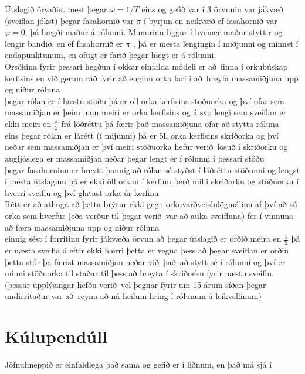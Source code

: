 \documentclass[a4]{article}
\begin{document}
  Útslagið örvaðist mest þegar $\omega = 1/T$ eins og gefið var í 3
 örvunin var jákvæð (sveiflan jókst) þegar  fasahornið var $\pi$ í byrjun en neikvæð ef fasahornið var  $\varphi = 0$, þá hægði maður á rólunni.
 Munurinn liggur í hvenær maður styttir og lengir bandið, en ef fasahornið er $\pi$%
, þá er mesta lengingin í miðjunni og minnst í endapunktunum,
  en öfugt er farið þegar hægt er á rólunni. \\
Orsökina fyrir þessari hegðun í okkar einfalda módeli er að finna í orkubúskap kerfisins en við gerum ráð fyrir að enginn orka fari í að hreyfa massamiðjuna upp og niður róluna\\
þegar rólan er í hæstu stöðu þá er öll orka kerfisins stöðuorka og því ofar sem massamiðjan er þeim mun meiri er orka kerfisins og á svo lengi sem sveiflan er ekki meiri en $\frac{\pi}{2}$ frá lóðréttu þá færir það massamiðjuna ofar að stytta róluna\\
eins þegar rólan er lárétt (í mijunni) þá er öll orka kerfisins skriðorka og því neðar sem massamiðjan er því meiri stöðuorka hefur verið losuð í skriðorku og augljóslega er massamiðjan neðar þegar lengt er í rólunni í þessari stöðu\\
þegar fasahorninu er breytt þannig að rólan sé styðst í lóðréttu stöðunni og lengst í mesta útslaginu þá er ekki öll orkan í kerfinu færð milli skriðorku og stöðuorku í hverri sveiflu og því glatast orka úr kerfinu \\ Rétt er að athuga að þetta brýtur ekki gegn orkuvarðveislulögmálinu af því að sú orka sem hverfur (eða verður til þegar verið var að auka sveifluna) fer í vinnuna að færa massamiðjuna upp og niður róluna\\
einnig sést í forritinu fyrir jákvæða örvun að þegar útslagið er orðið meira en $\frac{\pi}{2}$ þá er næsta sveifla á eftir ekki hærri þetta er vegna þess að þegar sveiflan er orðin þetta stór þá færist massamiðjan neðar við það að stytt sé í rólunni og því er minni stöðuorka til staðar til þess að breyta í skriðorku fyrir næstu sveiflu. (þessar upplýsingar hefðu verið vel þegnar fyrir um 15 árum síðan þegar undirritaður var að reyna að ná heilum hring í rólunum á leikvellinum)

\section{Kúlupendúll}
 Jöfnuhneppið er einfaldlega það sama og gefið er í liðnum, en það má sjá í 

\end{document}
